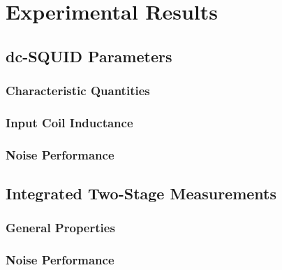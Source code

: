 \chapter{Experimental Results}

\section{dc-SQUID Parameters}

\subsection{Characteristic Quantities}

\subsection{Input Coil Inductance}

\subsection{Noise Performance}

\section{Integrated Two-Stage Measurements}

\subsection{General Properties}

\subsection{Noise Performance}